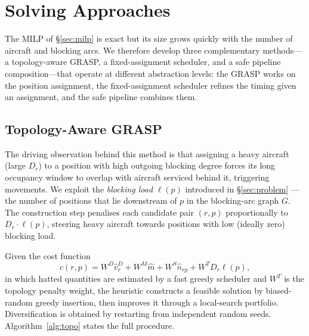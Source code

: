 \section{Solving Approaches}
\label{sec:approaches}

The MILP of \S\ref{sec:milp} is exact but its size grows quickly with the
number of aircraft and blocking arcs.  We therefore develop three
complementary methods---a topology-aware GRASP, a fixed-assignment
scheduler, and a safe pipeline composition---that operate at different
abstraction levels: the GRASP works on the position assignment, the
fixed-assignment scheduler refines the timing given an assignment, and the
safe pipeline combines them.

\subsection{Topology-Aware GRASP}
\label{sec:topo_heuristic}

The driving observation behind this method is that assigning a heavy
aircraft (large $D_r$) to a position with high outgoing blocking degree
forces its long occupancy window to overlap with aircraft serviced behind
it, triggering movements.  We exploit the \emph{blocking load} $\ell(p)$ introduced in
\S\ref{sec:problem} --- the number of positions that lie downstream of
$p$ in the blocking-arc graph $G$.  The construction step penalises each
candidate pair $(r, p)$ proportionally to $D_r \cdot \ell(p)$, steering
heavy aircraft towards positions with low (ideally zero) blocking load.

Given the cost function
\[
  c(r, p) = W^D \hat{v}^D_r + W^M \hat{m}
            + W^S \hat{n}_{rp} + W^T D_r \ell(p),
\]
in which hatted quantities are estimated by a fast greedy scheduler and
$W^T$ is the topology penalty weight, the heuristic constructs a feasible
solution by biased-random greedy insertion, then improves it through a
local-search portfolio.  Diversification is obtained by restarting from
independent random seeds.  Algorithm~\ref{alg:topo} states the full
procedure.

